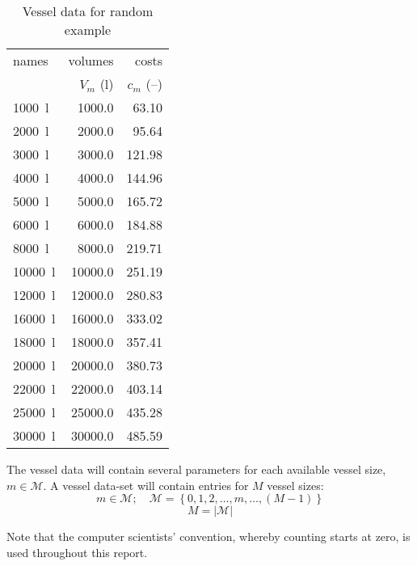 \begin{table}[h!]
    \centering
    \caption{Vessel data for random example}
    \label{tbl.vessel}
    \begin{tabular}{l | r | r}
        names & volumes & costs\\
        & $V_{m}$ (l) & $c_{m}$ (--)\\\hline
        \SI{1000}{\litre} & \SI{1000.0}{} & \SI{63.10}{}\\
        \SI{2000}{\litre} & \SI{2000.0}{} & \SI{95.64}{}\\
        \SI{3000}{\litre} & \SI{3000.0}{} & \SI{121.98}{}\\
        \SI{4000}{\litre} & \SI{4000.0}{} & \SI{144.96}{}\\
        \SI{5000}{\litre} & \SI{5000.0}{} & \SI{165.72}{}\\
        \SI{6000}{\litre} & \SI{6000.0}{} & \SI{184.88}{}\\
        \SI{8000}{\litre} & \SI{8000.0}{} & \SI{219.71}{}\\
        \SI{10000}{\litre} & \SI{10000.0}{} & \SI{251.19}{}\\
        \SI{12000}{\litre} & \SI{12000.0}{} & \SI{280.83}{}\\
        \SI{16000}{\litre} & \SI{16000.0}{} & \SI{333.02}{}\\
        \SI{18000}{\litre} & \SI{18000.0}{} & \SI{357.41}{}\\
        \SI{20000}{\litre} & \SI{20000.0}{} & \SI{380.73}{}\\
        \SI{22000}{\litre} & \SI{22000.0}{} & \SI{403.14}{}\\
        \SI{25000}{\litre} & \SI{25000.0}{} & \SI{435.28}{}\\
        \SI{30000}{\litre} & \SI{30000.0}{} & \SI{485.59}{}\\
    \end{tabular}
\end{table}

The vessel data will contain several parameters for each available vessel size,
$m \in \mathcal{M}$.
A vessel data-set will contain entries for $M$ vessel sizes:
\begin{equation}
    m \in \mathcal{M}; \quad \mathcal{M} = \left\{ 0, 1, 2, \ldots, m, \ldots,
    \left( M - 1 \right) \right\}
\end{equation}
\begin{equation}
    M = |\mathcal{M}|
\end{equation}

Note that the computer scientists' convention, whereby counting starts at zero,
is used throughout this report.

